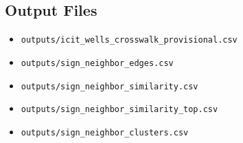﻿\documentclass[11pt,a4paper]{article}
\begin{document}
\subsection*{Output Files}
\begin{itemize}
\item \texttt{outputs/icit\_wells\_crosswalk\_provisional.csv}
\item \texttt{outputs/sign\_neighbor\_edges.csv}
\item \texttt{outputs/sign\_neighbor\_similarity.csv}
\item \texttt{outputs/sign\_neighbor\_similarity\_top.csv}
\item \texttt{outputs/sign\_neighbor\_clusters.csv}
\end{itemize}
\end{document}
